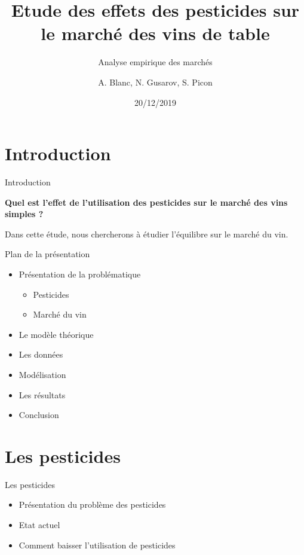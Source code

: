 \documentclass[11pt,ignorenonframetext,]{beamer}
\title{Etude des effets des pesticides sur le marché des vins de table}
\subtitle{Analyse empirique des marchés}
\author{A. Blanc, N. Gusarov, S. Picon}
\institute{Université Grenoble Alpes}
\date{20/12/2019}
\providecommand{\tightlist}{%
  \setlength{\itemsep}{0pt}\setlength{\parskip}{0pt}}
\begin{document}
\frame{\titlepage}

\hypertarget{introduction}{%
\section{Introduction}\label{introduction}}

\begin{frame}{Introduction}
\protect\hypertarget{introduction-1}{}

\center

\textbf{Quel est l'effet de l'utilisation des pesticides sur le marché des vins simples ?}

Dans cette étude, nous chercherons à étudier l'équilibre sur le marché
du vin.

\end{frame}

\begin{frame}{Plan de la présentation}
\protect\hypertarget{plan-de-la-presentation}{}

\begin{itemize}
\tightlist
\item
  Présentation de la problématique

  \begin{itemize}
  \tightlist
  \item
    Pesticides
  \item
    Marché du vin
  \end{itemize}
\item
  Le modèle théorique
\item
  Les données
\item
  Modélisation
\item
  Les résultats
\item
  Conclusion
\end{itemize}

\end{frame}

\hypertarget{les-pesticides}{%
\section{Les pesticides}\label{les-pesticides}}

\begin{frame}{Les pesticides}
\protect\hypertarget{les-pesticides-1}{}

\begin{itemize}
\tightlist
\item
  Présentation du problème des pesticides
\item
  Etat actuel
\item
  Comment baisser l'utilisation de pesticides
\end{itemize}

\end{frame}
\end{document}
